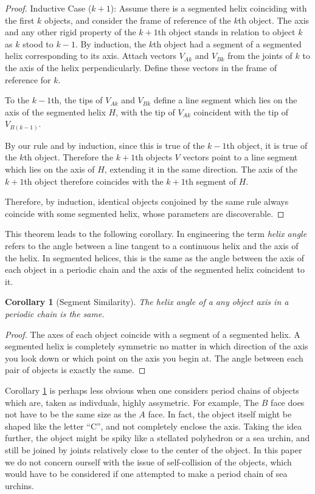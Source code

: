 \documentclass[11pt]{article}
\newtheorem{corollary}{Corollary}
\begin{document}
{\begin{proof}
  Inductive Case ($k+1$):
  Assume there is a segmented helix coinciding with the first $k$ objects, and
  consider the frame of reference of the $k$th object. The axis and any
  other rigid property of the $k+1$th object stands in relation to object $k$
  as $k$ stood to $k-1$. By induction, the $k$th object had a segment
  of a segmented helix corresponding to its axis. Attach vectors $V_{Ak}$ and $V_{Bk}$
  from the
  joints of $k$ to the axis of the helix perpendicularly. Define these
  vectors in the frame of reference for $k$.

  To the $k-1$th, the tips of  $V_{Ak}$ and $V_{Bk}$ define
  a line segment which lies on the axis of the segmented helix $H$, with the
  tip of $V_{Ak}$ coincident with the tip of $V_{B(k-1)}$.

  By our rule and by induction, since this is true of the $k-1$th object,
  it is true of the $k$th object. Therefore the $k+1$th objects $V$ vectors
  point to a line segment which lies on the axis of $H$, extending it
  in the same direction. The axis of the $k+1$th object therefore coincides
  with the $k+1$th segment of $H$.

  Therefore, by induction, identical objects conjoined by the same rule always
  coincide with some segmented helix, whose parameters are discoverable.
\end{proof}

This theorem leads to the following corollary. In engineering the term {\em helix angle} refers to the angle between a line tangent to a continuous helix and
the axis of the helix. In segmented helices, this is the same
as the angle between the
axis of each object in a periodic chain and the axis of the
  segmented helix coincident to it.
\begin{corollary}[Segment Similarity]
  The helix angle of a any object axis in a periodic chain is the same.
  \label{cor:symmetric}
\end{corollary}

\begin{proof}
  The axes of each object coincide with a segment of a segmented helix.
  A segmented helix is completely symmetric no matter in which direction
  of the axis you look down or which point on the axis you begin at. The angle between each pair of objects
  is exactly the same.
\end{proof}

Corollary \ref{cor:symmetric} is perhaps less obvious when one considers
period chains of objects which are, taken as indivduals, highly assymetric.
For example,
The $B$ face does not have to be the same size as the $A$ face. In fact,
the object itself might be shaped like the letter ``C'', and not completely
enclose the axis. Taking the idea further, the object might be spiky
like a stellated polyhedron or a sea urchin, and still be joined by
joints relatively close to the center of the object. In this paper
we do not concern ourself with the issue of self-collision of the objects,
which would have to be considered if one attempted to make a period chain
of sea urchins.

}
\end{document}
